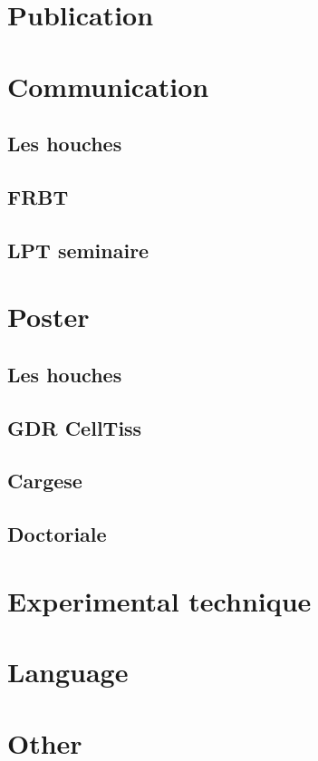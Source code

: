 \section{Publication}
\section{Communication}
\subsection{Les houches}
\subsection{FRBT}
\subsection{LPT seminaire}
\section{Poster}
\subsection{Les houches}
\subsection{GDR CellTiss}
\subsection{Cargese}
\subsection{Doctoriale}


\section{Experimental technique}
\section{Language}
\section{Other}


